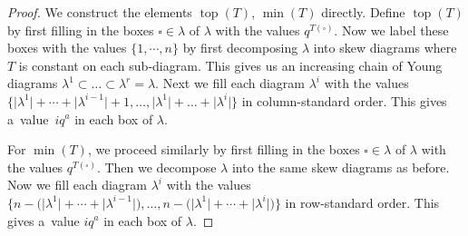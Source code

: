 \documentclass[10pt,a4paper]{amsart}
\numberwithin{equation}{section}
\theoremstyle{definition}
\DeclareMathOperator{\Top}{\mathrm{top}}
\DeclareMathOperator{\Min}{\mathrm{min}}
\begin{document}
\begin{proof}
 We construct the elements $\Top(T)$, $\Min(T)$ directly. Define $\Top(T)$ by first filling in the boxes $\square \in \lambda$ of $\lambda$ with the values $q^{T(\square)}$. Now we label these boxes with the values $\{1,\cdots, n \}$ by first decomposing $\lambda$ into skew diagrams where $T$ is constant on each sub-diagram. This gives us an increasing chain of Young diagrams $\lambda^{1}\subset \dots \subset \lambda^{r} = \lambda$. Next we fill each diagram $\lambda^{i}$ with the values $\big\{\big|\lambda^{1}\big|+\cdots + \big|\lambda^{i-1}\big|+1,\dots, \big|\lambda^{1}\big|+\dots + \big|\lambda^{i}\big| \big\} $ in column-standard order. This gives a~value~$iq^a$ in each box of $\lambda$.

 For $\Min(T)$, we proceed similarly by first filling in the boxes $\square \in \lambda$ of $\lambda$ with the values $q^{T(\square)}$. Then we decompose $\lambda$ into the same skew diagrams as before. Now we fill each diagram $\lambda^{i}$ with the values $\big\{n-\bigl(\big|\lambda^{1}\big|+\cdots + \big|\lambda^{i-1}\big|\bigr),\dots, n-\bigl(\big|\lambda^{1}\big|+\cdots + \big|\lambda^{i}\big|\bigr) \big\} $ in row-standard order. This gives a~value $iq^a$ in each box of $\lambda$.
\end{proof}
\end{document}
